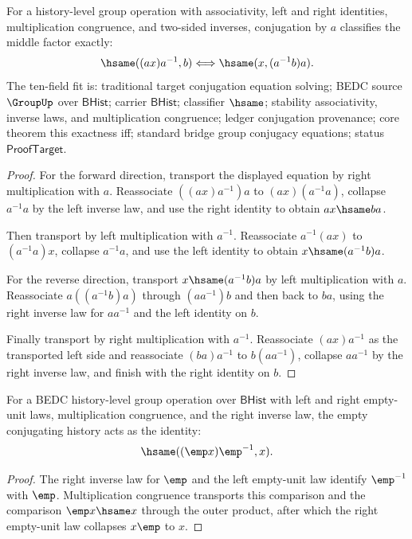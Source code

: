 \begin{theorem}
\label{thm:group-conjugation-equation-exactness}
For a history-level group operation with associativity, left and right
identities, multiplication congruence, and two-sided inverses, conjugation by
$a$ classifies the middle factor exactly:
$$
\hsame((a x)a^{-1},b) \Longleftrightarrow \hsame(x,(a^{-1}b)a).
$$
The ten-field fit is: traditional target conjugation equation solving; BEDC
source $\GroupUp$ over $\mathsf{BHist}$; carrier $\mathsf{BHist}$; classifier
$\hsame$; stability associativity, inverse laws, and multiplication
congruence; ledger conjugation provenance; core theorem this exactness iff;
standard bridge group conjugacy equations; status $\mathsf{ProofTarget}$.
\end{theorem}
\begin{proof}
For the forward direction, transport the displayed equation by right
multiplication with $a$. Reassociate $((a x)a^{-1})a$ to
$(a x)(a^{-1}a)$, collapse $a^{-1}a$ by the left inverse law, and use the
right identity to obtain $a x\hsame b a$.

Then transport by left multiplication with $a^{-1}$. Reassociate
$a^{-1}(a x)$ to $(a^{-1}a)x$, collapse $a^{-1}a$, and use the left identity
to obtain $x\hsame (a^{-1}b)a$.

For the reverse direction, transport $x\hsame (a^{-1}b)a$ by left
multiplication with $a$. Reassociate $a((a^{-1}b)a)$ through
$(aa^{-1})b$ and then back to $b a$, using the right inverse law for
$aa^{-1}$ and the left identity on $b$.

Finally transport by right multiplication with $a^{-1}$. Reassociate
$(a x)a^{-1}$ as the transported left side and reassociate
$(b a)a^{-1}$ to $b(aa^{-1})$, collapse $aa^{-1}$ by the right inverse law,
and finish with the right identity on $b$.
\end{proof}

\begin{theorem}
\label{thm:group-conjugation-empty-action}
For a BEDC history-level group operation over $\mathsf{BHist}$ with left and
right empty-unit laws, multiplication congruence, and the right inverse law,
the empty conjugating history acts as the identity:
$$
\hsame((\emp x)\emp^{-1},x).
$$
\end{theorem}
\begin{proof}
The right inverse law for $\emp$ and the left empty-unit law identify
$\emp^{-1}$ with $\emp$. Multiplication congruence transports this comparison
and the comparison $\emp x\hsame x$ through the outer product, after which the
right empty-unit law collapses $x\emp$ to $x$.
\end{proof}

